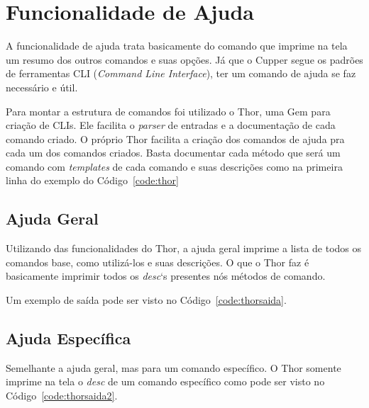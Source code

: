 \section{Funcionalidade de Ajuda}
\label{sec:help}

A funcionalidade de ajuda trata basicamente do comando que imprime na tela um resumo
dos outros comandos e suas opções. Já que o Cupper segue os padrões de ferramentas
CLI (\textit{Command Line Interface}), ter um comando de ajuda se faz necessário
e útil.

Para montar a estrutura de comandos foi utilizado o Thor, uma Gem para criação
de CLIs. Ele facilita o \textit{parser} de entradas e a documentação de cada comando criado.
O próprio Thor facilita a criação dos comandos de ajuda pra cada um dos comandos
criados. Basta documentar cada método que será um comando com \textit{templates} de cada
comando e suas descrições como na primeira linha do exemplo do Código~\ref{code:thor}

\noindent\begin{minipage}{\textwidth}
  \lstset{style=shell}
  
\end{minipage}\hfill

\subsection{Ajuda Geral}
Utilizando das funcionalidades do Thor, a ajuda geral imprime a lista de todos
os comandos base, como utilizá-los e suas descrições. O que o Thor faz é basicamente
imprimir todos os \textit{desc}`s presentes nós métodos de comando.

Um exemplo de saída pode ser visto no Código~\ref{code:thorsaida}.

\noindent\begin{minipage}{\textwidth}
  \lstset{style=shell}
  
\end{minipage}\hfill


\subsection{Ajuda Específica}
Semelhante a ajuda geral, mas para um comando específico. O Thor somente imprime
na tela o \textit{desc} de um comando específico como pode ser visto no Código~\ref{code:thorsaida2}.

\noindent\begin{minipage}{\textwidth}
  \lstset{style=shell}
  
\end{minipage}\hfill
